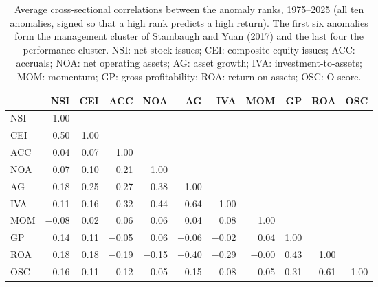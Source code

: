 \documentclass[12pt,a4paper]{article}
\begin{document}
\begin{singlespace}
\begin{table}[!htbp]\centering
\caption{Average cross-sectional correlations between the anomaly ranks, 1975--2025 (all ten anomalies, signed so that a high rank predicts a high return). The first six anomalies form the management cluster of Stambaugh and Yuan (2017) and the last four the performance cluster. NSI: net stock issues; CEI: composite equity issues; ACC: accruals; NOA: net operating assets; AG: asset growth; IVA: investment-to-assets; MOM: momentum; GP: gross profitability; ROA: return on assets; OSC: O-score.}\label{tab:corr}
\footnotesize
\setlength{\tabcolsep}{4pt}\begin{tabular}{lrrrrrrrrrr}\toprule
 & NSI & CEI & ACC & NOA & AG & IVA & MOM & GP & ROA & OSC\\\midrule
NSI & 1.00 &  &  &  &  &  &  &  &  & \\
CEI & 0.50 & 1.00 &  &  &  &  &  &  &  & \\
ACC & 0.04 & 0.07 & 1.00 &  &  &  &  &  &  & \\
NOA & 0.07 & 0.10 & 0.21 & 1.00 &  &  &  &  &  & \\
AG & 0.18 & 0.25 & 0.27 & 0.38 & 1.00 &  &  &  &  & \\
IVA & 0.11 & 0.16 & 0.32 & 0.44 & 0.64 & 1.00 &  &  &  & \\
MOM & \ensuremath{-}0.08 & 0.02 & 0.06 & 0.06 & 0.04 & 0.08 & 1.00 &  &  & \\
GP & 0.14 & 0.11 & \ensuremath{-}0.05 & 0.06 & \ensuremath{-}0.06 & \ensuremath{-}0.02 & 0.04 & 1.00 &  & \\
ROA & 0.18 & 0.18 & \ensuremath{-}0.19 & \ensuremath{-}0.15 & \ensuremath{-}0.40 & \ensuremath{-}0.29 & \ensuremath{-}0.00 & 0.43 & 1.00 & \\
OSC & 0.16 & 0.11 & \ensuremath{-}0.12 & \ensuremath{-}0.05 & \ensuremath{-}0.15 & \ensuremath{-}0.08 & \ensuremath{-}0.05 & 0.31 & 0.61 & 1.00\\
\bottomrule\end{tabular}
\end{table}


\end{singlespace}
\end{document}
